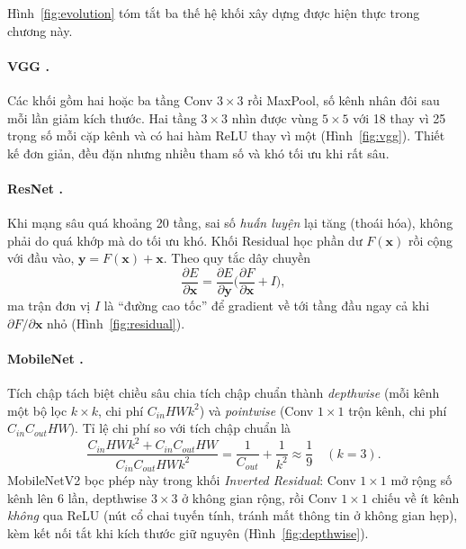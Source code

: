 Hình~\ref{fig:evolution} tóm tắt ba thế hệ khối xây dựng được hiện thực trong chương này.


\paragraph{VGG \cite{simonyan2015}.} Các khối gồm hai hoặc ba tầng Conv $3{\times}3$ rồi MaxPool, số kênh nhân đôi sau mỗi
lần giảm kích thước. Hai tầng $3{\times}3$ nhìn được vùng $5{\times}5$ với 18 thay vì 25 trọng số mỗi cặp kênh và có hai
hàm ReLU thay vì một (Hình~\ref{fig:vgg}). Thiết kế đơn giản, đều đặn nhưng nhiều tham số và khó tối ưu khi rất sâu.


\paragraph{ResNet \cite{he2016}.} Khi mạng sâu quá khoảng 20 tầng, sai số \emph{huấn luyện} lại tăng (thoái hóa), không
phải do quá khớp mà do tối ưu khó. Khối Residual học phần dư $F(\mathbf{x})$ rồi cộng với đầu vào,
$\mathbf{y} = F(\mathbf{x}) + \mathbf{x}$. Theo quy tắc dây chuyền
\begin{equation}
  \frac{\partial E}{\partial \mathbf{x}} = \frac{\partial E}{\partial \mathbf{y}}\Big(\frac{\partial F}{\partial \mathbf{x}} + I\Big),
\end{equation}
ma trận đơn vị $I$ là “đường cao tốc” để gradient về tới tầng đầu ngay cả khi $\partial F/\partial\mathbf{x}$ nhỏ
(Hình~\ref{fig:residual}).


\paragraph{MobileNet \cite{howard2017,sandler2018}.} Tích chập tách biệt chiều sâu chia tích chập chuẩn thành
\emph{depthwise} (mỗi kênh một bộ lọc $k{\times}k$, chi phí $C_{in}HWk^2$) và \emph{pointwise} (Conv $1{\times}1$ trộn
kênh, chi phí $C_{in}C_{out}HW$). Tỉ lệ chi phí so với tích chập chuẩn là
\begin{equation}
  \frac{C_{in}HWk^2 + C_{in}C_{out}HW}{C_{in}C_{out}HWk^2} = \frac{1}{C_{out}} + \frac{1}{k^2} \approx \frac{1}{9}\quad (k = 3).
\end{equation}
MobileNetV2 bọc phép này trong khối \emph{Inverted Residual}: Conv $1{\times}1$ mở rộng số kênh lên 6 lần, depthwise
$3{\times}3$ ở không gian rộng, rồi Conv $1{\times}1$ chiếu về ít kênh \emph{không} qua ReLU (nút cổ chai tuyến tính, tránh
mất thông tin ở không gian hẹp), kèm kết nối tắt khi kích thước giữ nguyên (Hình~\ref{fig:depthwise}).

